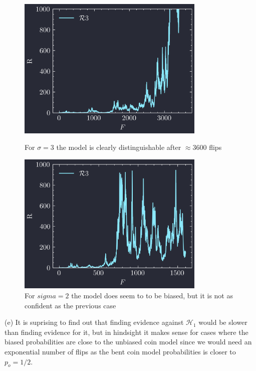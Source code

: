 \documentclass[../main.tex]{subfiles}
\begin{document}
\begin{figure}[ht]
    \centering
    \begin{minipage}{0.5\textwidth}
        \centering
        \includegraphics[width=0.8\textwidth]{hw2_3e1.png}
        \captionsetup{width=0.8\linewidth}
        \caption{For $\sigma = 3$ the model is clearly distinguishable after $\approx 3600$ flips}
        \label{fig:hw2_3e1}
    \end{minipage}%
    \begin{minipage}{0.5\textwidth}
        \centering
        \includegraphics[width=0.8\textwidth]{hw2_3e2.png}
        \captionsetup{width=0.8\linewidth}
        \caption{For $sigma = 2$ the model does seem to to be biased, but it is not as confident as the
        previous case}
        \label{fig:hw2_3e2}
    \end{minipage}
\end{figure}

(e) It is suprising to find out that finding evidence against $\mathcal{H}_1$ would be slower than
finding evidence for it, but in hindsight it makes sense for cases where the biased probabilities 
are close to the unbiased coin model since we would need an exponential number of flips as the bent
coin model probabilities is closer to $p_o = 1/2$. 
\end{document}
